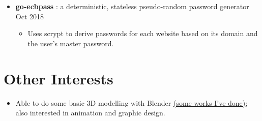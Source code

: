 \begin{itemize}
    \item \textbf{go-ecbpass} : a deterministic, stateless pseudo-random password generator \dashdiv{} Oct 2018

    \begin{itemize}
      \item Uses scrypt to derive passwords for each website based on its domain and the user's master password.
    \end{itemize}

  \end{itemize}

  \section{Other Interests}

  \begin{itemize}[itemsep=0.1\parskip]
    \item Able to do some basic 3D modelling with Blender \href{https://maowtm.org/Artworks/}{\color{link}(some works I've done)}; also interested in animation and graphic design.
  \end{itemize}


